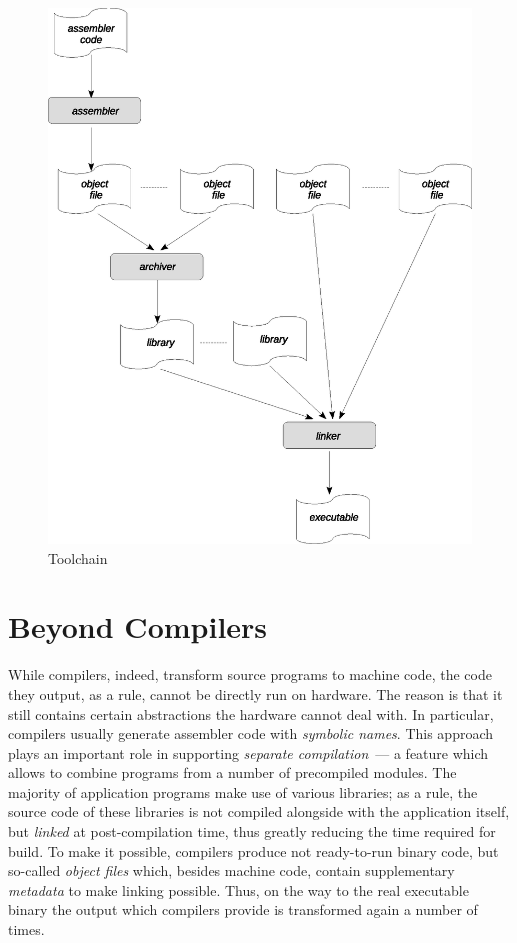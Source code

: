 \begin{figure}[t]
  \centering
  \includegraphics[scale=0.7]{images/01-09.eps}
  \caption{Toolchain}
  \label{toolchain}
\end{figure}

\section{Beyond Compilers}

While compilers, indeed, transform source programs to machine code, the code they output, as a rule, cannot be directly run on hardware.
The reason is that it still contains certain abstractions the hardware cannot deal with. In particular, compilers usually generate
assembler code with \emph{symbolic names}. This approach plays an important role in supporting \emph{separate compilation}~--- a
feature which allows to combine programs from a number of precompiled modules. The majority of application programs
make use of various libraries; as a rule, the source code of these libraries is not compiled alongside with the application itself, but
\emph{linked} at post-compilation time, thus greatly reducing the time required for build. To make it possible, compilers
produce not ready-to-run binary code, but so-called \emph{object files} which, besides machine code, contain supplementary
\emph{metadata} to make linking possible. Thus, on the way to the real executable binary the output which compilers provide
is transformed again a number of times.


